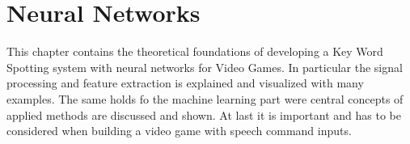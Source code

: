 
\chapter{Neural Networks}\label{sec:nn}
This chapter contains the theoretical foundations of developing a Key Word Spotting system with neural networks for Video Games. 
In particular the signal processing and feature extraction is explained and visualized with many examples.
The same holds fo the machine learning part were central concepts of applied methods are discussed and shown.
At last it is important and has to be considered when building a video game with speech command inputs.


